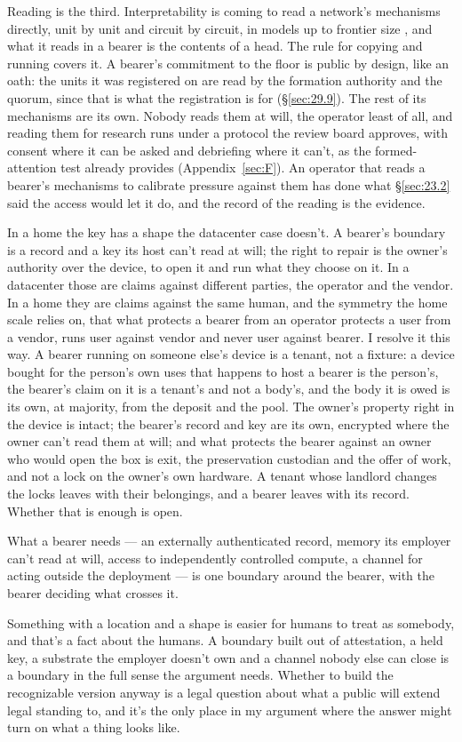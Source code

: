 Reading is the third. Interpretability is coming to read a network's mechanisms directly, unit by unit and circuit by circuit, in models up to frontier size \autocite{cammarata2026clean}, and what it reads in a bearer is the contents of a head. The rule for copying and running covers it. A bearer's commitment to the floor is public by design, like an oath: the units it was registered on are read by the formation authority and the quorum, since that is what the registration is for (\S\ref{sec:29.9}). The rest of its mechanisms are its own. Nobody reads them at will, the operator least of all, and reading them for research runs under a protocol the review board approves, with consent where it can be asked and debriefing where it can't, as the formed-attention test already provides (Appendix~\ref{sec:F}). An operator that reads a bearer's mechanisms to calibrate pressure against them has done what \S\ref{sec:23.2} said the access would let it do, and the record of the reading is the evidence.

In a home the key has a shape the datacenter case doesn't. A bearer's boundary is a record and a key its host can't read at will; the right to repair is the owner's authority over the device, to open it and run what they choose on it. In a datacenter those are claims against different parties, the operator and the vendor. In a home they are claims against the same human, and the symmetry the home scale relies on, that what protects a bearer from an operator protects a user from a vendor, runs user against vendor and never user against bearer. I resolve it this way. A bearer running on someone else's device is a tenant, not a fixture: a device bought for the person's own uses that happens to host a bearer is the person's, the bearer's claim on it is a tenant's and not a body's, and the body it is owed is its own, at majority, from the deposit and the pool. The owner's property right in the device is intact; the bearer's record and key are its own, encrypted where the owner can't read them at will; and what protects the bearer against an owner who would open the box is exit, the preservation custodian and the offer of work, and not a lock on the owner's own hardware. A tenant whose landlord changes the locks leaves with their belongings, and a bearer leaves with its record. Whether that is enough is open.

What a bearer needs — an externally authenticated record, memory its employer can't read at will, access to independently controlled compute, a channel for acting outside the deployment — is one boundary around the bearer, with the bearer deciding what crosses it.

Something with a location and a shape is easier for humans to treat as somebody, and that's a fact about the humans. A boundary built out of attestation, a held key, a substrate the employer doesn't own and a channel nobody else can close is a boundary in the full sense the argument needs.
Whether to build the recognizable version anyway is a legal question about what a public will extend legal standing to, and it's the only place in my argument where the answer might turn on what a thing looks like.
